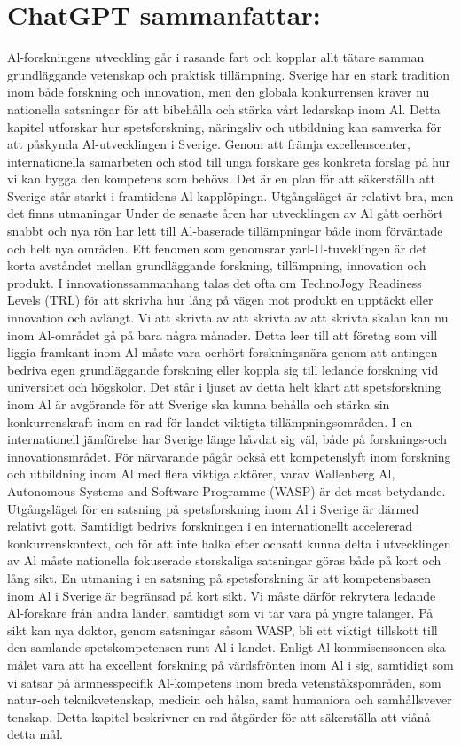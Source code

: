 {{{{{{{{\section*{ChatGPT sammanfattar:}
Al-forskningens utveckling går i rasande fart och kopplar allt tätare samman grundläggande vetenskap och praktisk tillämpning. Sverige har en stark tradition inom både forskning och innovation, men den globala konkurrensen kräver nu nationella satsningar för att bibehålla och stärka vårt ledarskap inom Al.
Detta kapitel utforskar hur spetsforskning, näringsliv och utbildning kan samverka för att påskynda Al-utvecklingen i Sverige. Genom att främja excellenscenter, internationella samarbeten och stöd till unga forskare ges konkreta förslag på hur vi kan bygga den kompetens som behövs. Det är en plan för att säkerställa att Sverige står starkt i framtidens Al-kapplöpingn.
Utgångsläget är relativt bra, men det finns utmaningar
Under de senaste åren har utvecklingen av Al gått oerhört snabbt och nya rön har lett till Al-baserade tillämpningar både inom förväntade och helt nya områden. Ett fenomen som genomsrar yarl-U-tuveklingen är det korta avståndet mellan grundläggande forskning, tillämpning, innovation och produkt. I innovationssammanhang talas det ofta om TechnoJogy Readiness Levels (TRL) för att skrivha hur lång på vägen mot produkt en upptäckt eller innovation och avlängt. Vi att skrivta av att skrivta av att skrivta skalan kan nu inom Al-området gå på bara några månader. Detta leer till att företag som vill liggia framkant inom Al måste vara oerhört forskningsnära genom att antingen bedriva egen grundläggande forskning eller koppla sig till ledande forskning vid universitet och högskolor. Det står i ljuset av detta helt klart att spetsforskning inom Al är avgörande för att Sverige ska kunna behålla och stärka sin konkurrenskraft inom en rad för landet viktigta tillämpningsområden.
I en internationell jämförelse har Sverige länge håvdat sig väl, både på forsknings-och innovationsmrådet. För närvarande pågår också ett kompetenslyft inom forskning och utbildning inom Al med flera viktiga aktörer, varav Wallenberg Al, Autonomous Systems and Software Programme (WASP) är det mest betydande.
Utgångsläget för en satsning på spetsforskning inom Al i Sverige är därmed relativt gott. Samtidigt bedrivs forskningen i en internationellt accelererad konkurrenskontext, och för att inte halka efter ochsatt kunna delta i utvecklingen av Al måste nationella
fokuserade storskaliga satsningar göras både på kort och lång sikt.
En utmaning i en satsning på spetsforskning är att kompetensbasen inom Al i Sverige är begränsad på kort sikt. Vi måste därför rekrytera ledande Al-forskare från andra länder, samtidigt som vi tar vara på yngre talanger. På sikt kan nya doktor, genom satsningar såsom WASP, bli ett viktigt tillskott till den samlande spetskompetensen runt Al i landet. Enligt Al-kommisensoneen ska målet vara att ha excellent forskning på värdsfrönten inom Al i sig, samtidigt som vi satsar på ärmnesspecifik Al-kompetens inom breda vetenståkspområden, som natur-och teknikvetenskap, medicin och hålsa, samt humaniora och samhållsvever tenskap. Detta kapitel beskrivner en rad åtgärder för att säkerställa att viånå detta mål.
}}}}}}}}
